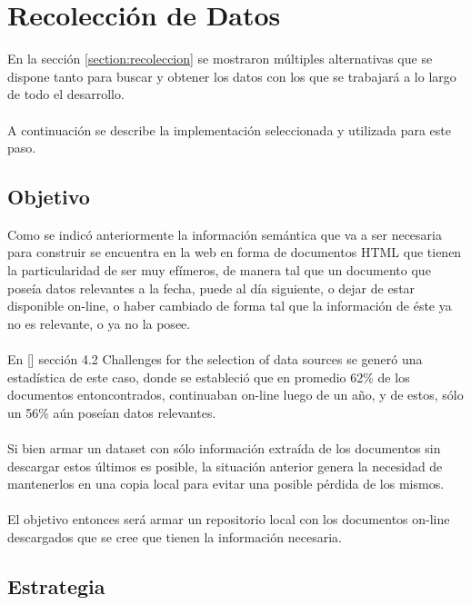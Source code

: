 \chapter{Recolección de Datos}
\label{chapter:recoleccion}

En la sección \ref{section:recoleccion} se mostraron múltiples alternativas que se dispone 
tanto para buscar y obtener los datos con los que se trabajará a lo largo de todo el desarrollo.
\\\\
A continuación se describe la implementación seleccionada y utilizada para este paso.

\section{Objetivo}
\label{section:recoleccion-objetivo}

\noindent Como se indicó anteriormente la información semántica que va a ser necesaria para construir se encuentra en la web en forma de documentos 
HTML que tienen la particularidad de ser muy efímeros, de manera tal que un documento que poseía datos relevantes a la fecha,
puede al día siguiente, o dejar de estar disponible on-line, o haber cambiado de forma tal que la información de éste ya no es 
relevante, o ya no la posee. 
\\\\
En [] sección 4.2 Challenges for the selection of data sources se generó una estadística de este caso, donde se estableció que 
en promedio 62\% de los documentos entoncontrados, continuaban on-line luego de un año, y de estos, sólo un 56\% aún poseían 
datos relevantes. 
\\\\
Si bien armar un dataset con sólo información extraída de los documentos sin descargar estos últimos es posible, la situación anterior 
genera la necesidad de mantenerlos en una copia local para evitar una posible pérdida de los mismos. 
\\\\
El objetivo entonces será armar un repositorio local con los documentos on-line descargados que se cree que tienen la información 
necesaria. 

 
\section{Estrategia}
\label{section:recoleccion-estrategia}

